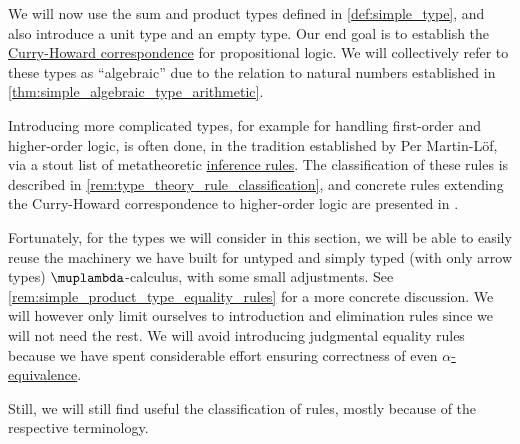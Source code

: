 \begin{remark}\label{rem:extended_simple_type_theory}
  We will now use the sum and product types defined in \cref{def:simple_type}, and also introduce a unit type and an empty type. Our end goal is to establish the \hyperref[con:curry_howard_correspondence]{Curry-Howard correspondence} for propositional logic. We will collectively refer to these types as \enquote{algebraic} due to the relation to natural numbers established in \cref{thm:simple_algebraic_type_arithmetic}.

  Introducing more complicated types, for example for handling first-order and higher-order logic, is often done, in the tradition established by Per Martin-L\"of, via a stout list of metatheoretic \hyperref[def:inference_rule]{inference rules}. The classification of these rules is described in \cref{rem:type_theory_rule_classification}, and concrete rules extending the Curry-Howard correspondence to higher-order logic are presented in .

  Fortunately, for the types we will consider in this section, we will be able to easily reuse the machinery we have built for untyped and simply typed (with only arrow types) \( \muplambda \)-calculus, with some small adjustments. See \cref{rem:simple_product_type_equality_rules} for a more concrete discussion. We will however only limit ourselves to introduction and elimination rules since we will not need the rest. We will avoid introducing judgmental equality rules because we have spent considerable effort ensuring correctness of even \hyperref[def:lambda_term_alpha_equivalence]{\( \alpha \)-equivalence}.

  Still, we will still find useful the classification of rules, mostly because of the respective terminology.
\end{remark}

